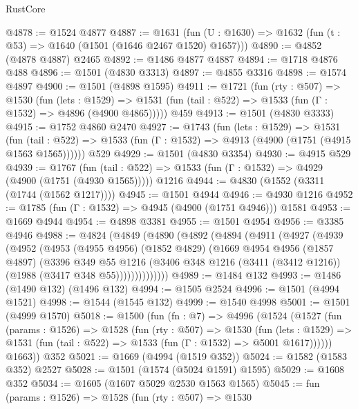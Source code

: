 \begin{lexlean}{RustCore}
\begin{coremodule}
@4878 := @1524 @4877
@4887 := @1631 (fun (U : @1630) => @1632 (fun (t : @53) => @1640 (@1501 (@1646 @2467 @1520) @1657)))
@4890 := @4852 (@4878 @4887) @2465
@4892 := @1486 @4877 @4887
@4894 := @1718 @4876 @488
@4896 := @1501 (@4830 @3313)
@4897 := @4855 @3316
@4898 := @1574 @4897
@4900 := @1501 (@4898 @1595)
@4911 := @1721
    (fun (rty : @507) =>
    @1530
      (fun (lets : @1529) =>
      @1531 (fun (tail : @522) => @1533 (fun (Γ : @1532) => @4896 (@4900 @4865)))))
    @459
@4913 := @1501 (@4830 @3333)
@4915 := @1752 @4860 @2470
@4927 := @1743
    (fun (lets : @1529) =>
    @1531
      (fun (tail : @522) => @1533 (fun (Γ : @1532) => @4913 (@4900 (@1751 (@4915 @1563 @1565))))))
    @529
@4929 := @1501 (@4830 @3354)
@4930 := @4915 @529
@4939 := @1767
    (fun (tail : @522) => @1533 (fun (Γ : @1532) => @4929 (@4900 (@1751 (@4930 @1565)))))
    @1216
@4944 := @4830 (@1552 (@3311 (@1744 (@1562 @1217))))
@4945 := @1501 @4944
@4946 := @4930 @1216
@4952 := @1785 (fun (Γ : @1532) => @4945 (@4900 (@1751 @4946))) @1581
@4953 := @1669 @4944
@4954 := @4898 @3381
@4955 := @1501 @4954
@4956 := @3385 @4946
@4988 := @4824
    (@4849
      (@4890
        (@4892
          (@4894
            (@4911
              (@4927
                (@4939
                  (@4952
                    (@4953
                      (@4955 @4956)
                      (@1852 @4829)
                      (@1669
                        @4954
                        @4956
                        (@1857 @4897)
                        (@3396
                          @349
                          @55
                          @1216
                          (@3406
                            @348
                            @1216
                            (@3411 (@3412 @1216))
                            (@1988 (@3417 @348 @55))))))))))))))
@4989 := @1484 @132
@4993 := @1486 (@1490 @132) (@1496 @132)
@4994 := @1505 @2524
@4996 := @1501 (@4994 @1521)
@4998 := @1544 (@1545 @132)
@4999 := @1540 @4998
@5001 := @1501 (@4999 @1570)
@5018 := @1500
    (fun (fn : @7) =>
    @4996
      (@1524
        (@1527
          (fun (params : @1526) =>
          @1528
            (fun (rty : @507) =>
            @1530
              (fun (lets : @1529) =>
              @1531 (fun (tail : @522) => @1533 (fun (Γ : @1532) => @5001 @1617))))))
        @1663))
    @352
@5021 := @1669 (@4994 (@1519 @352))
@5024 := @1582 (@1583 @352) @2527
@5028 := @1501 (@1574 (@5024 @1591) @1595)
@5029 := @1608 @352
@5034 := @1605 (@1607 @5029 @2530 @1563 @1565)
@5045 := fun (params : @1526) =>
  @1528
    (fun (rty : @507) =>
    @1530

\end{coremodule}
\end{lexlean}
